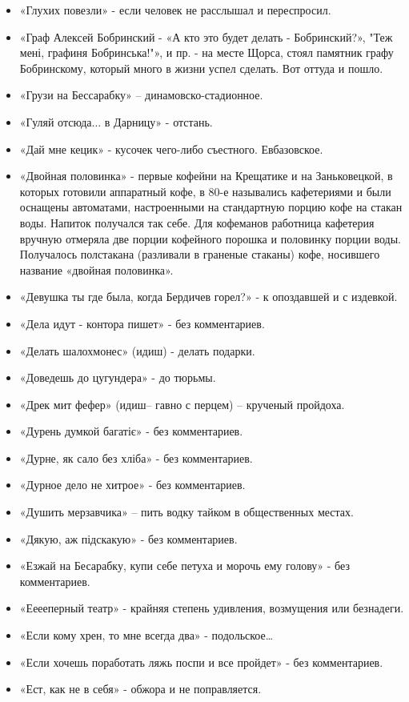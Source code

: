 \begin{itemize}
\item  «Глухих повезли» - если человек не расслышал и переспросил.
\item  «Граф Алексей Бобринский - «А кто это будет делать - Бобринский?», "Теж мені, графиня Бобринська!"», и пр. - на месте Щорса, стоял памятник графу Бобринскому, который много в жизни успел сделать. Вот оттуда и пошло.
\item  «Грузи на Бессарабку» – динамовско-стадионное.
\item  «Гуляй отсюда... в Дарницу» - отстань.
\item  «Дай мне кецик» - кусочек чего-либо съестного. Евбазовское.
\item  «Двойная половинка» - первые кофейни на Крещатике и на Заньковецкой, в которых готовили аппаратный кофе, в 80-е назывались кафетериями и были оснащены автоматами, настроенными на стандартную порцию кофе на стакан воды. Напиток получался так себе. Для кофеманов работница кафетерия вручную отмеряла две порции кофейного порошка и половинку порции воды. Получалось полстакана (разливали в граненые стаканы) кофе, носившего название «двойная половинка».
\item  «Девушка ты где была, когда Бердичев горел?» - к опоздавшей и с издевкой.
\item  «Дела идут - контора пишет» - без комментариев.
\item  «Делать шалохмонес» (идиш) - делать подарки.
\item  «Доведешь до цугундера» - до тюрьмы.
\item  «Дрек мит фефер» (идиш– гавно с перцем) – крученый пройдоха. 
\item  «Дурень думкой багатіє» - без комментариев.
\item  «Дурне, як сало без хліба» - без комментариев.
\item  «Дурное дело не хитрое» - без комментариев.
\item  «Душить мерзавчика» – пить водку тайком в общественных местах.
\item  «Дякую, аж підскакую» - без комментариев.
\item  «Езжай на Бесарабку, купи себе петуха и морочь ему голову» - без комментариев.
\item  «Ееееперный театр» - крайняя степень удивления, возмущения или безнадеги.
\item  «Если кому хрен, то мне всегда два» - подольское…
\item  «Если хочешь поработать ляжь поспи и все пройдет» - без комментариев.
\item  «Ест, как не в себя» - обжора и не поправляется.

\end{itemize}
